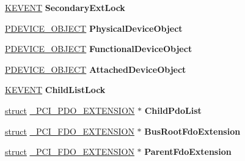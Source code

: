 \begin{DoxyCompactItemize}
\hyperlink{struct___k_e_v_e_n_t}{K\+E\+V\+E\+NT} {\bfseries Secondary\+Ext\+Lock}
\item 
\mbox{\label{struct___p_c_i___f_d_o___e_x_t_e_n_s_i_o_n_a522452ffa23e318d823e8ec9ce118f46}} 
\hyperlink{struct___d_e_v_i_c_e___o_b_j_e_c_t}{P\+D\+E\+V\+I\+C\+E\+\_\+\+O\+B\+J\+E\+CT} {\bfseries Physical\+Device\+Object}
\item 
\mbox{\label{struct___p_c_i___f_d_o___e_x_t_e_n_s_i_o_n_abbb321e74ded503e29cbc395077c5547}} 
\hyperlink{struct___d_e_v_i_c_e___o_b_j_e_c_t}{P\+D\+E\+V\+I\+C\+E\+\_\+\+O\+B\+J\+E\+CT} {\bfseries Functional\+Device\+Object}
\item 
\mbox{\label{struct___p_c_i___f_d_o___e_x_t_e_n_s_i_o_n_a48a6940bc73daec9aaccef85ae1985e2}} 
\hyperlink{struct___d_e_v_i_c_e___o_b_j_e_c_t}{P\+D\+E\+V\+I\+C\+E\+\_\+\+O\+B\+J\+E\+CT} {\bfseries Attached\+Device\+Object}
\item 
\mbox{\label{struct___p_c_i___f_d_o___e_x_t_e_n_s_i_o_n_af160e40682765f6ff91efda0c0d35b3b}} 
\hyperlink{struct___k_e_v_e_n_t}{K\+E\+V\+E\+NT} {\bfseries Child\+List\+Lock}
\item 
\mbox{\label{struct___p_c_i___f_d_o___e_x_t_e_n_s_i_o_n_ac6e66f96dc39454b300c3b72e7694302}} 
\hyperlink{interfacestruct}{struct} \hyperlink{struct___p_c_i___p_d_o___e_x_t_e_n_s_i_o_n}{\+\_\+\+P\+C\+I\+\_\+\+P\+D\+O\+\_\+\+E\+X\+T\+E\+N\+S\+I\+ON} $\ast$ {\bfseries Child\+Pdo\+List}
\item 
\mbox{\label{struct___p_c_i___f_d_o___e_x_t_e_n_s_i_o_n_add4f6bc3ea129c3d64f7d82599237fa0}} 
\hyperlink{interfacestruct}{struct} \hyperlink{struct___p_c_i___f_d_o___e_x_t_e_n_s_i_o_n}{\+\_\+\+P\+C\+I\+\_\+\+F\+D\+O\+\_\+\+E\+X\+T\+E\+N\+S\+I\+ON} $\ast$ {\bfseries Bus\+Root\+Fdo\+Extension}
\item 
\mbox{\label{struct___p_c_i___f_d_o___e_x_t_e_n_s_i_o_n_a715b29fe6703c9c964d2c2645961fb94}} 
\hyperlink{interfacestruct}{struct} \hyperlink{struct___p_c_i___f_d_o___e_x_t_e_n_s_i_o_n}{\+\_\+\+P\+C\+I\+\_\+\+F\+D\+O\+\_\+\+E\+X\+T\+E\+N\+S\+I\+ON} $\ast$ {\bfseries Parent\+Fdo\+Extension}

\end{DoxyCompactItemize}
